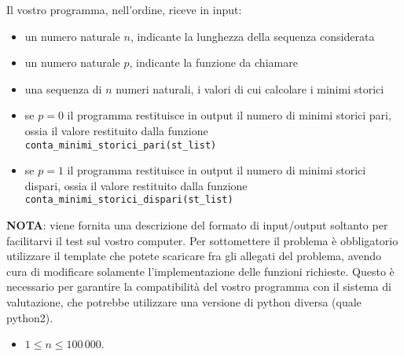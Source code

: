 \InputFile
Il vostro programma, nell'ordine, riceve in input:
\begin{itemize}
\item un numero naturale $n$, indicante la lunghezza della sequenza considerata 
\item un numero naturale $p$, indicante la funzione da chiamare
\item una sequenza di $n$ numeri naturali, i valori di cui calcolare i minimi storici
\end{itemize}

\OutputFile
\begin{itemize}
\item se $p = 0$ il programma restituisce in output il numero di minimi storici pari,
  ossia il valore restituito dalla funzione \texttt{conta\_minimi\_storici\_pari(st\_list)}
\item se $p = 1$ il programma restituisce in output il numero di minimi storici 
  dispari, ossia il valore restituito dalla funzione \texttt{conta\_minimi\_storici\_dispari(st\_list)}
\end{itemize}

\textbf{NOTA}: viene fornita una descrizione del formato di input/output soltanto 
per facilitarvi il test sul vostro computer. Per sottomettere il problema è obbligatorio 
utilizzare il template che potete scaricare fra gli allegati del problema, avendo 
cura di modificare solamente l'implementazione delle funzioni richieste. Questo 
è necessario per garantire la compatibilità del vostro programma con il sistema 
di valutazione, che potrebbe utilizzare una versione di python diversa (quale python2).

\Examples
\textwidth %
\textwidth %
\begin{example}
%
%
%
%
%
\end{example}

\Constraints
\begin{itemize}[nolistsep, noitemsep]
  \item $1 \le n \le 100\,000$.
\end{itemize}


